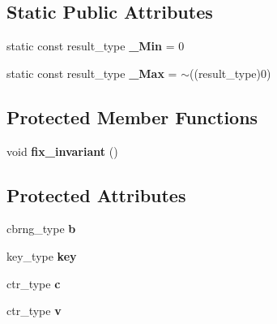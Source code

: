 \subsection*{Static Public Attributes}
\begin{DoxyCompactItemize}
\item 
\hypertarget{structr123_1_1Engine_aa73e4d27847915f1438fd37b30777111}{}\label{structr123_1_1Engine_aa73e4d27847915f1438fd37b30777111} 
static const result\+\_\+type {\bfseries \+\_\+\+Min} = 0
\item 
\hypertarget{structr123_1_1Engine_ae549f81e966b0414bcaf0f24b566ebd8}{}\label{structr123_1_1Engine_ae549f81e966b0414bcaf0f24b566ebd8} 
static const result\+\_\+type {\bfseries \+\_\+\+Max} = $\sim$((result\+\_\+type)0)
\end{DoxyCompactItemize}
\subsection*{Protected Member Functions}
\begin{DoxyCompactItemize}
\item 
\hypertarget{structr123_1_1Engine_aa7ad87d7238a0f820ee37640071dee7d}{}\label{structr123_1_1Engine_aa7ad87d7238a0f820ee37640071dee7d} 
void {\bfseries fix\+\_\+invariant} ()
\end{DoxyCompactItemize}
\subsection*{Protected Attributes}
\begin{DoxyCompactItemize}
\item 
\hypertarget{structr123_1_1Engine_a5e430e850badcc4fd0f74de4a49a673b}{}\label{structr123_1_1Engine_a5e430e850badcc4fd0f74de4a49a673b} 
cbrng\+\_\+type {\bfseries b}
\item 
\hypertarget{structr123_1_1Engine_adb9e1841a81f213a115e9f092f5c4654}{}\label{structr123_1_1Engine_adb9e1841a81f213a115e9f092f5c4654} 
key\+\_\+type {\bfseries key}
\item 
\hypertarget{structr123_1_1Engine_afb056ed93053f4175aabc9f4e5dd7b8d}{}\label{structr123_1_1Engine_afb056ed93053f4175aabc9f4e5dd7b8d} 
ctr\+\_\+type {\bfseries c}
\item 
\hypertarget{structr123_1_1Engine_a6169d4fbce1fd7725fabda4c693bf250}{}\label{structr123_1_1Engine_a6169d4fbce1fd7725fabda4c693bf250} 
ctr\+\_\+type {\bfseries v}
\end{DoxyCompactItemize}
